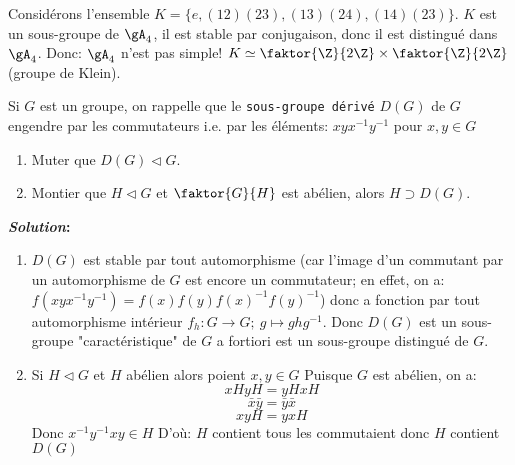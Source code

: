 \begin{exercise}
\begin{enumerate}
	\end{enumerate}


	\begin{remark}
		Considérons l'ensemble $K=\{e, (12)(23), (13)(24), (14)(23)\}$. $K$ est un sous-groupe de $\gA_4$, il est stable par conjugaison, donc il est distingué dans $\gA_4$. Donc: $\gA_4$ n'est pas simple! $K\simeq \faktor{\Z}{2\Z}\times\faktor{\Z}{2\Z}$ (groupe de Klein).
	\end{remark}

\end{exercise}

\begin{exercise}

	Si $G$ est un groupe, on rappelle que le \texttt{sous-groupe dérivé} $D(G)$ de $G$ engendre par les commutateurs i.e. par les éléments: $xyx^{-1}y^{-1}$ pour $x,y\in G$

	\begin{enumerate}
		\item Muter que $D(G)\vartriangleleft G$.
		\item Montier que $H\vartriangleleft G$ et $\faktor{G}{H}$ est abélien, alors $H\supset D(G)$.
	\end{enumerate}

	\textbf{\emph{Solution}:}

	\begin{enumerate}
		\item $D(G)$ est stable par tout automorphisme (car l'image d'un commutant par un automorphisme de $G$ est encore un commutateur; en effet, on a:
		$f(xyx^{-1}y^{-1})=f(x)f(y)f(x)^{-1}f(y)^{-1}$)
		donc a fonction par tout automorphisme intérieur $f_h:G\rightarrow G;\ g\mapsto ghg^{-1}$. Donc $D(G)$ est un sous-groupe "caractéristique" de $G$ a fortiori est un sous-groupe distingué de $G$.
		\item Si $H\vartriangleleft G$ et $H$ abélien alors poient $x,y\in G$ Puisque $G$ est abélien, on a:
		$$xH yH=yH xH$$
		$$\bar x \bar y=\bar y\bar x$$
		$$xyH=yxH$$
		Donc $x^{-1}y^{-1}xy\in H$ D'où: $H$ contient tous les commutaient donc $H$ contient $D(G)$
	\end{enumerate}

\end{exercise}
